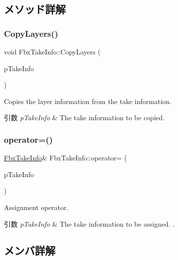 \subsection{メソッド詳解}
\mbox{\label{class_fbx_take_info_ac8e073b31c0de56fc7dbfcdd006d4f3f}} 
\subsubsection{\texorpdfstring{Copy\+Layers()}{CopyLayers()}}
{\footnotesize\ttfamily void Fbx\+Take\+Info\+::\+Copy\+Layers (\begin{DoxyParamCaption}\item[{const \hyperlink{class_fbx_take_info}{Fbx\+Take\+Info} \&}]{p\+Take\+Info }\end{DoxyParamCaption})}

Copies the layer information from the take information. 
\begin{DoxyParams}{引数}
{\em p\+Take\+Info} & The take information to be copied. \\
\hline
\end{DoxyParams}
\mbox{\label{class_fbx_take_info_abbce118f64f716e965162ddcaacc024b}} 
\subsubsection{\texorpdfstring{operator=()}{operator=()}}
{\footnotesize\ttfamily \hyperlink{class_fbx_take_info}{Fbx\+Take\+Info}\& Fbx\+Take\+Info\+::operator= (\begin{DoxyParamCaption}\item[{const \hyperlink{class_fbx_take_info}{Fbx\+Take\+Info} \&}]{p\+Take\+Info }\end{DoxyParamCaption})}

Assignment operator. 
\begin{DoxyParams}{引数}
{\em p\+Take\+Info} & The take information to be assigned. . \\
\hline
\end{DoxyParams}


\subsection{メンバ詳解}
\mbox{\label{class_fbx_take_info_a77d4856b8de2b91d9f84baaa97529240}} 
